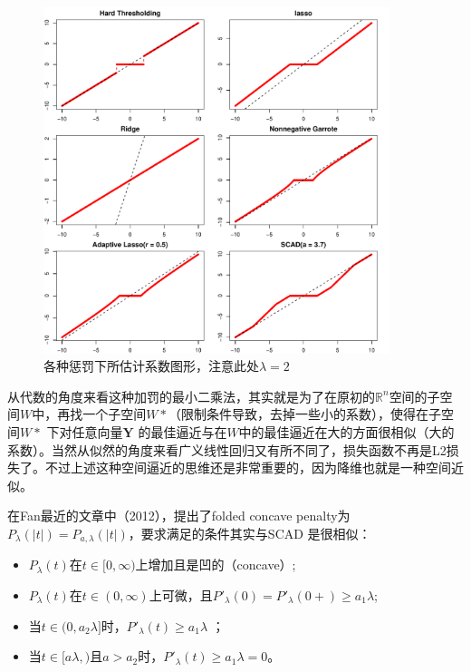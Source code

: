 ﻿\documentclass[hyperref,12pt]{ctexart}
\begin{document}
\begin{figure}[ht]
\centering
\includegraphics[width = 0.9\textwidth]{fig.pdf}
\caption{各种惩罚下所估计系数图形，注意此处$\lambda = 2$}\label{fig}
\end{figure}

从代数的角度来看这种加罚的最小二乘法，其实就是为了在原初的$\mathbb{R}^n$空间的子空间$W$中，再找一个子空间$W*$（限制条件导致，去掉一些小的系数），使得在子空间$W*$ 下对任意向量$\mathbf{Y}$ 的最佳逼近与在$W$中的最佳逼近在大的方面很相似（大的系数）。当然从似然的角度来看广义线性回归又有所不同了，损失函数不再是L2损失了。不过上述这种空间逼近的思维还是非常重要的，因为降维也就是一种空间近似。

在Fan最近的文章中（2012），提出了folded concave penalty为$P_{\lambda}(|t|) = P_{a, \lambda}(|t|)$，要求满足的条件其实与SCAD 是很相似：
\begin{itemize}
  \item $P_{\lambda}(t)$在$t \in [0, \infty)$上增加且是凹的（concave）;
  \item $P_{\lambda}(t)$在$t \in (0, \infty)$上可微，且$P'_{\lambda}(0) = P'_{\lambda}(0+) \geq a_1 \lambda$;
  \item 当$t \in (0, a_2 \lambda]$时，$P'_{\lambda}(t) \geq a_1 \lambda$ ；
  \item 当$t \in [a \lambda, )$且$a > a_2$时，$P'_{\lambda}(t) \geq a_1 \lambda = 0$。
\end{itemize}
\end{document}
